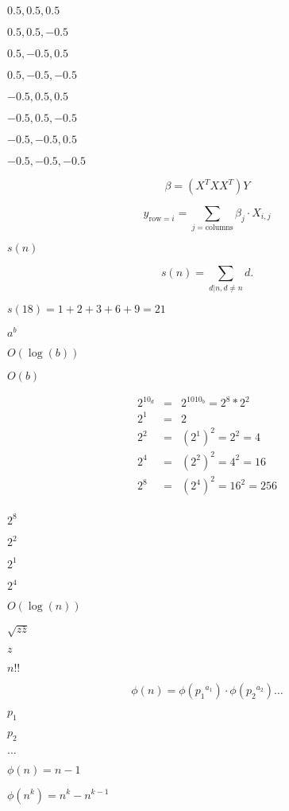 \documentclass{article}
\begin{document}
${0.5, 0.5, 0.5}$
\pagebreak

${0.5, 0.5, -0.5}$
\pagebreak

${0.5, -0.5, 0.5}$
\pagebreak

${0.5, -0.5, -0.5}$
\pagebreak

${-0.5, 0.5, 0.5}$
\pagebreak

${-0.5, 0.5, -0.5}$
\pagebreak

${-0.5, -0.5, 0.5}$
\pagebreak

${-0.5, -0.5, -0.5}$
\pagebreak

\[\beta = \left(X^TXX^T\right)Y\]
\pagebreak

\[y_{\text{row}=i} = \sum_{j=\text{columns}}\beta_j\cdot X_{i,j}\]
\pagebreak

$s(n)$
\pagebreak

\[
     s(n) = \sum_{d|n, d\neq n}d.
\]
\pagebreak

$s(18) = 1 + 2 + 3 + 6 + 9 = 21 $
\pagebreak

$a^b$
\pagebreak

$O(\log(b))$
\pagebreak

$O(b)$
\pagebreak

\begin{eqnarray*}
2^{10_d} &=& 2^{1010_b} = 2^8 * 2^2\\
2^1 &=& 2\\
2^2 &=& (2^1)^2 = 2^2 = 4\\
2^4 &=& (2^2)^2 = 4^2 = 16\\
2^8 &=& (2^4)^2 = 16^2 = 256\\
\end{eqnarray*}
\pagebreak

$2^8$
\pagebreak

$2^2$
\pagebreak

$2^1$
\pagebreak

$2^4$
\pagebreak

$O(\log(n))$
\pagebreak

$ \sqrt{z \bar{z}} $
\pagebreak

$ z $
\pagebreak

$n!!$
\pagebreak

\[\phi(n) =
\phi\left({p_1}^{a_1}\right)\cdot\phi\left({p_2}^{a_2}\right)\ldots\]
\pagebreak

$p_1$
\pagebreak

$p_2$
\pagebreak

$\ldots$
\pagebreak

$\phi(n) = n-1$
\pagebreak

$\phi(n^k) = n^k - n^{k-1}$
\pagebreak
\end{document}
